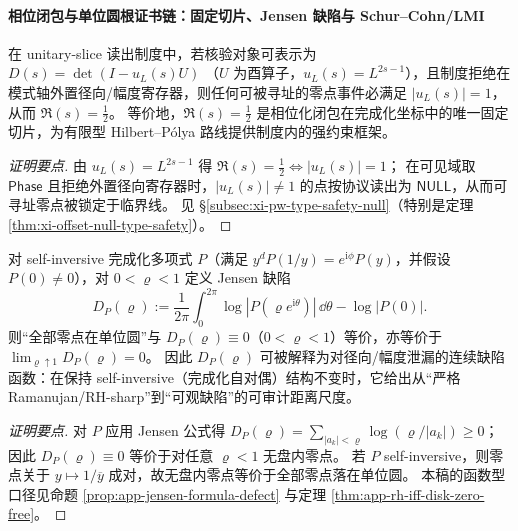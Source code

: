 \paragraph{相位闭包与单位圆根证书链：固定切片、Jensen 缺陷与 Schur--Cohn/LMI}

\begin{conclusion}[相位化闭包的唯一固定切片：拒绝外置径向寄存器时零点被制度性锁定在 \texorpdfstring{$\Re(s)=\tfrac12$}{Re(s)=1/2}]\label{con:xi-unitary-slice-unique-fixed-slice}
在 unitary-slice 读出制度中，若核验对象可表示为
\(
D(s)=\det(I-u_L(s)U)
\)
（\(U\) 为酉算子，\(u_L(s)=L^{2s-1}\)），且制度拒绝在模式轴外置径向/幅度寄存器，则任何可被寻址的零点事件必满足 \(|u_L(s)|=1\)，从而 \(\Re(s)=\tfrac12\)。
等价地，\(\Re(s)=\tfrac12\) 是相位化闭包在完成化坐标中的唯一固定切片，为有限型 Hilbert--P{\'o}lya 路线提供制度内的强约束框架。
\end{conclusion}
\begin{proof}[证明要点]
由 \(u_L(s)=L^{2s-1}\) 得 \(\Re(s)=\tfrac12\Longleftrightarrow |u_L(s)|=1\)；
在可见域取 \(\mathsf{Phase}\) 且拒绝外置径向寄存器时，\(|u_L(s)|\neq 1\) 的点按协议读出为 \(\mathsf{NULL}\)，从而可寻址零点被锁定于临界线。
见 \S\ref{subsec:xi-pw-type-safety-null}（特别是定理 \ref{thm:xi-offset-null-type-safety}）。
\end{proof}

\begin{conclusion}\label{con:xi-jensen-defect-horizon-entropy-distance}
对 self-inversive 完成化多项式 \(P\)（满足 \(y^dP(1/y)=e^{\mathrm{i}\phi}P(y)\)，并假设 \(P(0)\neq 0\)），对 \(0<\varrho<1\) 定义 Jensen 缺陷
\[
D_P(\varrho):=\frac{1}{2\pi}\int_{0}^{2\pi}\log|P(\varrho e^{\mathrm{i}\theta})|\,\dd\theta-\log|P(0)|.
\]
则“全部零点在单位圆”与 \(D_P(\varrho)\equiv 0\)（\(0<\varrho<1\)）等价，亦等价于
\(\lim_{\varrho\uparrow 1}D_P(\varrho)=0\)。
因此 \(D_P(\varrho)\) 可被解释为对径向/幅度泄漏的连续缺陷函数：在保持 self-inversive（完成化自对偶）结构不变时，它给出从“严格 Ramanujan/RH-sharp”到“可观缺陷”的可审计距离尺度。
\end{conclusion}
\begin{proof}[证明要点]
对 \(P\) 应用 Jensen 公式得 \(D_P(\varrho)=\sum_{|a_k|<\varrho}\log(\varrho/|a_k|)\ge 0\)；
因此 \(D_P(\varrho)\equiv 0\) 等价于对任意 \(\varrho<1\) 无盘内零点。
若 \(P\) self-inversive，则零点关于 \(y\mapsto 1/\overline y\) 成对，故无盘内零点等价于全部零点落在单位圆。
本稿的函数型口径见命题 \ref{prop:app-jensen-formula-defect} 与定理 \ref{thm:app-rh-iff-disk-zero-free}。
\end{proof}

